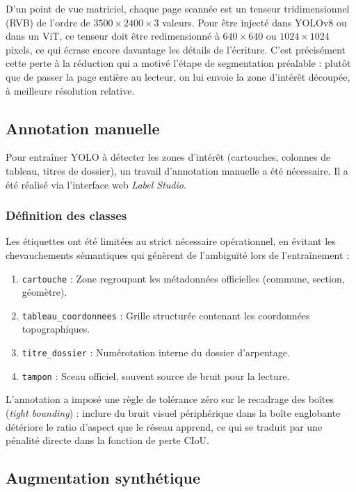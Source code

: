 D'un point de vue matriciel, chaque page scannée est un tenseur tridimensionnel (RVB) de l'ordre de $3500 \times 2400 \times 3$ valeurs. Pour être injecté dans YOLOv8 ou dans un ViT, ce tenseur doit être redimensionné à $640 \times 640$ ou $1024 \times 1024$ pixels, ce qui écrase encore davantage les détails de l'écriture. C'est précisément cette perte à la réduction qui a motivé l'étape de segmentation préalable : plutôt que de passer la page entière au lecteur, on lui envoie la zone d'intérêt découpée, à meilleure résolution relative.

\subsection{Annotation manuelle}

Pour entraîner YOLO à détecter les zones d'intérêt (cartouches, colonnes de tableau, titres de dossier), un travail d'annotation manuelle a été nécessaire. Il a été réalisé via l'interface web \textit{Label Studio}.

\subsubsection{Définition des classes}

Les étiquettes ont été limitées au strict nécessaire opérationnel, en évitant les chevauchements sémantiques qui génèrent de l'ambiguïté lors de l'entraînement :
\begin{enumerate}
    \item \texttt{cartouche} : Zone regroupant les métadonnées officielles (commune, section, géomètre).
    \item \texttt{tableau\_coordonnees} : Grille structurée contenant les coordonnées topographiques.
    \item \texttt{titre\_dossier} : Numérotation interne du dossier d'arpentage.
    \item \texttt{tampon} : Sceau officiel, souvent source de bruit pour la lecture.
\end{enumerate}

L'annotation a imposé une règle de tolérance zéro sur le recadrage des boîtes (\textit{tight bounding}) : inclure du bruit visuel périphérique dans la boîte englobante détériore le ratio d'aspect que le réseau apprend, ce qui se traduit par une pénalité directe dans la fonction de perte CIoU.

\subsection{Augmentation synthétique}

